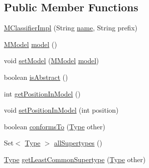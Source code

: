 \subsection*{Public Member Functions}
\begin{DoxyCompactItemize}
\item 
\hyperlink{classorg_1_1tzi_1_1use_1_1uml_1_1mm_1_1_m_classifier_impl_a8ebe2b60a3688b4bfa25315e38c3976c}{M\-Classifier\-Impl} (String \hyperlink{classorg_1_1tzi_1_1use_1_1uml_1_1mm_1_1_m_model_element_impl_ac9997b04c10d247c21c22d431d99400d}{name}, String prefix)
\item 
\hyperlink{classorg_1_1tzi_1_1use_1_1uml_1_1mm_1_1_m_model}{M\-Model} \hyperlink{classorg_1_1tzi_1_1use_1_1uml_1_1mm_1_1_m_classifier_impl_a63b7e242e28e3cec9899edee835bea96}{model} ()
\item 
void \hyperlink{classorg_1_1tzi_1_1use_1_1uml_1_1mm_1_1_m_classifier_impl_ad889eb97d5f92f89b58b46e5d5c786f2}{set\-Model} (\hyperlink{classorg_1_1tzi_1_1use_1_1uml_1_1mm_1_1_m_model}{M\-Model} \hyperlink{classorg_1_1tzi_1_1use_1_1uml_1_1mm_1_1_m_classifier_impl_a12a5d3d4ce833383eca8ef43a73e2484}{model})
\item 
boolean \hyperlink{classorg_1_1tzi_1_1use_1_1uml_1_1mm_1_1_m_classifier_impl_a80056bf25512763d06e3300c23f9bb06}{is\-Abstract} ()
\item 
int \hyperlink{classorg_1_1tzi_1_1use_1_1uml_1_1mm_1_1_m_classifier_impl_a8db24cdd91594bda56c9559595f4ac15}{get\-Position\-In\-Model} ()
\item 
void \hyperlink{classorg_1_1tzi_1_1use_1_1uml_1_1mm_1_1_m_classifier_impl_aad0cf22b90e4a5d00389c088fd5eb0ca}{set\-Position\-In\-Model} (int position)
\item 
boolean \hyperlink{classorg_1_1tzi_1_1use_1_1uml_1_1mm_1_1_m_classifier_impl_a12fc1764334231aa1680a1aaf0304151}{conforms\-To} (\hyperlink{interfaceorg_1_1tzi_1_1use_1_1uml_1_1ocl_1_1type_1_1_type}{Type} other)
\item 
Set$<$ \hyperlink{interfaceorg_1_1tzi_1_1use_1_1uml_1_1ocl_1_1type_1_1_type}{Type} $>$ \hyperlink{classorg_1_1tzi_1_1use_1_1uml_1_1mm_1_1_m_classifier_impl_ad62c1adecb7992a8e41211ac2c8c9e8b}{all\-Supertypes} ()
\item 
\hyperlink{interfaceorg_1_1tzi_1_1use_1_1uml_1_1ocl_1_1type_1_1_type}{Type} \hyperlink{classorg_1_1tzi_1_1use_1_1uml_1_1mm_1_1_m_classifier_impl_aa336b7396618df009fc6b625a36cac23}{get\-Least\-Common\-Supertype} (\hyperlink{interfaceorg_1_1tzi_1_1use_1_1uml_1_1ocl_1_1type_1_1_type}{Type} other)
\item 

\end{DoxyCompactItemize}
